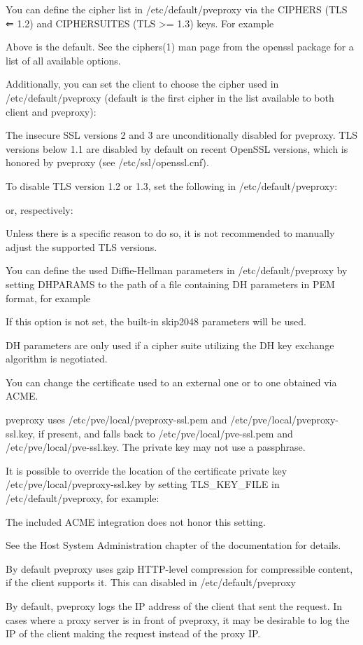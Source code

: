 You can define the cipher list in /etc/default/pveproxy via the CIPHERS (TLS ⇐ 1.2) and CIPHERSUITES (TLS >= 1.3) keys. For example

Above is the default. See the ciphers(1) man page from the openssl package for a list of all available options.

Additionally, you can set the client to choose the cipher used in /etc/default/pveproxy (default is the first cipher in the list available to both client and pveproxy):

The insecure SSL versions 2 and 3 are unconditionally disabled for pveproxy. TLS versions below 1.1 are disabled by default on recent OpenSSL versions, which is honored by pveproxy (see /etc/ssl/openssl.cnf).

To disable TLS version 1.2 or 1.3, set the following in /etc/default/pveproxy:

or, respectively:

Unless there is a specific reason to do so, it is not recommended to manually adjust the supported TLS versions.

You can define the used Diffie-Hellman parameters in /etc/default/pveproxy by setting DHPARAMS to the path of a file containing DH parameters in PEM format, for example

If this option is not set, the built-in skip2048 parameters will be used.

DH parameters are only used if a cipher suite utilizing the DH key exchange algorithm is negotiated.

You can change the certificate used to an external one or to one obtained via ACME.

pveproxy uses /etc/pve/local/pveproxy-ssl.pem and /etc/pve/local/pveproxy-ssl.key, if present, and falls back to /etc/pve/local/pve-ssl.pem and /etc/pve/local/pve-ssl.key. The private key may not use a passphrase.

It is possible to override the location of the certificate private key /etc/pve/local/pveproxy-ssl.key by setting TLS_KEY_FILE in /etc/default/pveproxy, for example:

The included ACME integration does not honor this setting.

See the Host System Administration chapter of the documentation for details.

By default pveproxy uses gzip HTTP-level compression for compressible content, if the client supports it. This can disabled in /etc/default/pveproxy

By default, pveproxy logs the IP address of the client that sent the request. In cases where a proxy server is in front of pveproxy, it may be desirable to log the IP of the client making the request instead of the proxy IP.


